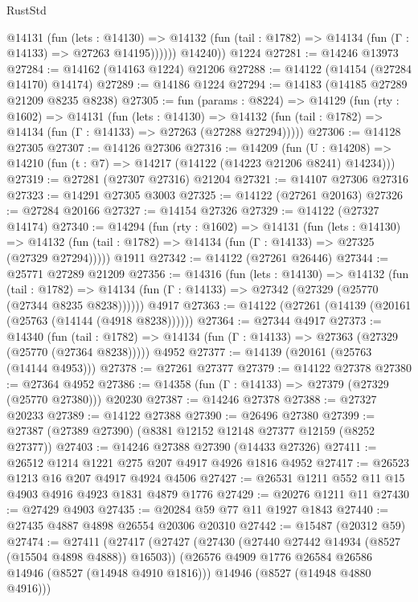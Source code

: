 \begin{lexlean}{RustStd}
\begin{coremodule}
            @14131
              (fun (lets : @14130) =>
              @14132 (fun (tail : @1782) => @14134 (fun (Γ : @14133) => @27263 @14195))))))
        @14240))
    @1224
@27281 := @14246 @13973
@27284 := @14162 (@14163 @1224) @21206
@27288 := @14122 (@14154 (@27284 @14170) @14174)
@27289 := @14186 @1224
@27294 := @14183 (@14185 @27289 @21209 @8235 @8238)
@27305 := fun (params : @8224) =>
  @14129
    (fun (rty : @1602) =>
    @14131
      (fun (lets : @14130) =>
      @14132 (fun (tail : @1782) => @14134 (fun (Γ : @14133) => @27263 (@27288 @27294)))))
@27306 := @14128 @27305
@27307 := @14126 @27306
@27316 := @14209
    (fun (U : @14208) => @14210 (fun (t : @7) => @14217 (@14122 (@14223 @21206 @8241) @14234)))
@27319 := @27281 (@27307 @27316) @21204
@27321 := @14107 @27306 @27316
@27323 := @14291 @27305 @3003
@27325 := @14122 (@27261 @20163)
@27326 := @27284 @20166
@27327 := @14154 @27326
@27329 := @14122 (@27327 @14174)
@27340 := @14294
    (fun (rty : @1602) =>
    @14131
      (fun (lets : @14130) =>
      @14132 (fun (tail : @1782) => @14134 (fun (Γ : @14133) => @27325 (@27329 @27294)))))
    @1911
@27342 := @14122 (@27261 @26446)
@27344 := @25771 @27289 @21209
@27356 := @14316
    (fun (lets : @14130) =>
    @14132
      (fun (tail : @1782) =>
      @14134 (fun (Γ : @14133) => @27342 (@27329 (@25770 (@27344 @8235 @8238))))))
    @4917
@27363 := @14122 (@27261 (@14139 (@20161 (@25763 (@14144 (@4918 @8238))))))
@27364 := @27344 @4917
@27373 := @14340
    (fun (tail : @1782) => @14134 (fun (Γ : @14133) => @27363 (@27329 (@25770 (@27364 @8238)))))
    @4952
@27377 := @14139 (@20161 (@25763 (@14144 @4953)))
@27378 := @27261 @27377
@27379 := @14122 @27378
@27380 := @27364 @4952
@27386 := @14358 (fun (Γ : @14133) => @27379 (@27329 (@25770 @27380))) @20230
@27387 := @14246 @27378
@27388 := @27327 @20233
@27389 := @14122 @27388
@27390 := @26496 @27380
@27399 := @27387 (@27389 @27390) (@8381 @12152 @12148 @27377 @12159 (@8252 @27377))
@27403 := @14246 @27388 @27390 (@14433 @27326)
@27411 := @26512 @1214 @1221 @275 @207 @4917 @4926 @1816 @4952
@27417 := @26523 @1213 @16 @207 @4917 @4924 @4506
@27427 := @26531 @1211 @552 @11 @15 @4903 @4916 @4923 @1831 @4879 @1776
@27429 := @20276 @1211 @11
@27430 := @27429 @4903
@27435 := @20284 @59 @77 @11 @1927 @1843
@27440 := @27435 @4887 @4898 @26554 @20306 @20310
@27442 := @15487 (@20312 @59)
@27474 := @27411
    (@27417
      (@27427
        (@27430 (@27440 @27442 @14934 (@8527 (@15504 @4898 @4888)) @16503))
        (@26576 @4909 @1776 @26584 @26586 @14946 (@8527 (@14948 @4910 @1816)))
        @14946
        (@8527 (@14948 @4880 @4916)))

\end{coremodule}
\end{lexlean}
